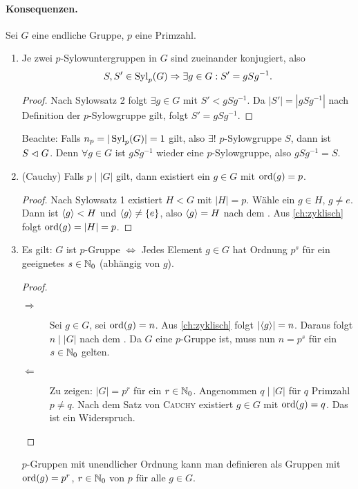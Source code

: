 \documentclass[12pt,a4paper]{scrartcl}
\begin{document}
\paragraph{Konsequenzen.}
Sei $G$ eine endliche Gruppe, $p$ eine Primzahl.
\begin{enumerate}
	\item Je zwei $p$-Sylowuntergruppen in $G$ sind zueinander konjugiert, also \[S, S'\in \operatorname{Syl}_p(G) \Rightarrow \exists g\in G: S' = gSg^{-1}.\] \label{kons:kong}
	\begin{proof}
		Nach Sylowsatz 2 folgt $\exists g\in G$ mit $S'<gSg^{-1}$. Da $|S'| = |gSg^{-1}|$ nach Definition der $p$-Sylowgruppe gilt, folgt $S' = gSg^{-1}$.
	\end{proof}
	
	Beachte: Falls $n_p  = |\operatorname{Syl}_p(G)| = 1$ gilt, also $\exists!$ $p$-Sylowgruppe $S$, dann ist $S\vartriangleleft G$. Denn $\forall g\in G$ ist $gSg^{-1}$ wieder eine $p$-Sylowgruppe, also $gSg^{-1} = S$.
	
	\item (Cauchy) Falls $p\mid|G|$ gilt, dann existiert ein $g\in G$ mit $\operatorname{ord}(g) = p$.
	\begin{proof}
		Nach Sylowsatz 1 existiert $H<G$ mit $|H| = p$. Wähle ein $g\in H$, $g\neq e$. Dann ist $\langle g\rangle <H$ und $\langle g\rangle \neq \{e\}$, also $\langle g\rangle = H$ nach dem . Aus \cref{ch:zyklisch} folgt $\operatorname{ord}(g) = |H| = p$.
	\end{proof}
	\item Es gilt: $G$ ist $p$-Gruppe $\Leftrightarrow $ Jedes Element $g\in G$ hat Ordnung $p^s$ für ein geeignetes $s\in \mathbb N_0$ (abhängig von $g$).
	\begin{proof}~
		\begin{description} %
			\item[\glqq$\Rightarrow$\grqq] Sei $g\in G$, sei $\operatorname{ord}(g) = n$. Aus \cref{ch:zyklisch} folgt $|\langle g\rangle| = n$. Daraus folgt $n\mid |G|$ nach dem . Da $G$ eine $p$-Gruppe ist, muss nun $n = p^s$ für ein $s \in \mathbb N_0$ gelten.
			\item[\grqq $\Leftarrow$\grqq] Zu zeigen: $|G| = p^r$ für ein $r\in\mathbb N_0$.
			Angenommen $q\mid|G|$ für $q$ Primzahl $p\neq q$. Nach dem Satz von \textsc{Cauchy} existiert $g\in G$ mit $\operatorname{ord}(g) = q$. Das ist ein Widerspruch.
		\end{description}
	\end{proof}
	\begin{bem}
		$p$-Gruppen mit unendlicher Ordnung kann man definieren als Gruppen mit $\operatorname{ord}(g) = p^r$, $r\in \mathbb N_0$ von $p$ für alle $g\in G$.
	\end{bem}
	
\end{enumerate}
\end{document}
